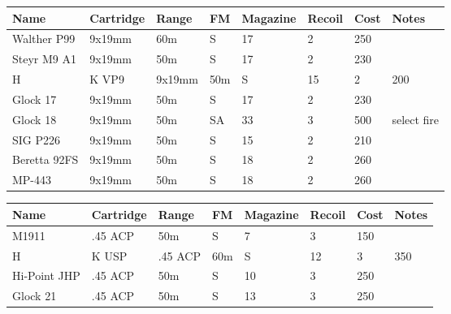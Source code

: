 \begin{center}
  \begin{tabular}{| l | l | l | l | l | l | l | l |}
    \hline
    \textbf{Name} & \textbf{Cartridge} & \textbf{Range} &
    \textbf{FM} & \textbf{Magazine} & \textbf{Recoil} &
    \textbf{Cost} & \textbf{Notes} \\ \hline

    Walther P99  & 9x19mm & 60m & S  & 17 & 2 & 250 & \\ \hline
    Steyr M9 A1  & 9x19mm & 50m & S  & 17 & 2 & 230 & \\ \hline
    H&K VP9      & 9x19mm & 50m & S  & 15 & 2 & 200 & \\ \hline
    Glock 17     & 9x19mm & 50m & S  & 17 & 2 & 230 & \\ \hline
    Glock 18     & 9x19mm & 50m & SA & 33 & 3 & 500 & select fire \\ \hline
    SIG P226     & 9x19mm & 50m & S  & 15 & 2 & 210 & \\ \hline
    Beretta 92FS & 9x19mm & 50m & S  & 18 & 2 & 260 & \\ \hline
    MP-443       & 9x19mm & 50m & S  & 18 & 2 & 260 & \\ \hline

  \end{tabular}
\end{center}

\begin{center}
  \begin{tabular}{| l | l | l | l | l | l | l | l |}
    \hline
    \textbf{Name} & \textbf{Cartridge} & \textbf{Range} &
    \textbf{FM} & \textbf{Magazine} & \textbf{Recoil} &
    \textbf{Cost} & \textbf{Notes} \\ \hline

    M1911        & .45 ACP & 50m & S &  7 & 3  & 150 & \\ \hline
    H&K USP      & .45 ACP & 60m & S & 12 & 3  & 350 & \\ \hline
    Hi-Point JHP & .45 ACP & 50m & S & 10 & 3  & 250 & \\ \hline
    Glock 21     & .45 ACP & 50m & S & 13 & 3  & 250 & \\ \hline

  \end{tabular}
\end{center}
